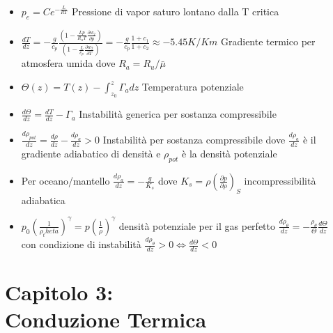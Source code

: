 \documentclass[a4paper]{article}
\begin{document}
\begin{itemize}
	\item $ p_e = C e^{- \frac{L}{RT}}$ Pressione di vapor saturo lontano dalla T critica
	\item $\frac{dT}{dz} = -\frac{g}{c_p} \frac{(1-\frac{Lp}{R_a T} \frac{\partial w_2}{\partial p})}{(1- \frac{L}{c_p} \frac{\partial w_2}{\partial T})} = -\frac{g}{c_p} \frac{1+c_1}{1+c_2} \approx -5.45K/Km$ Gradiente termico per atmosfera umida dove $R_a = R_u / \bar{\mu}$
	\item $\Theta (z)=T(z)-\int_{z_0}^{z}\Gamma_adz$ Temperatura potenziale
	\item $\frac{d \Theta}{dz}=\frac{dT}{dz}-\Gamma_a$ Instabilità generica per sostanza compressibile
	\item $\frac{d \rho_{pot}}{dz}=\frac{d \rho}{dz}-\frac{d \rho_a}{dz}>0 $ Instabilità per sostanza compressibile dove $\frac{d \rho_a}{dz}$ è il gradiente adiabatico di densità e $\rho_{pot}$ è la densità potenziale
	\item Per oceano/mantello $\frac{d \rho_a}{dz} = - \frac{g}{K_s}$ dove $K_s=\rho (\frac{\partial p}{\partial \rho})_S$ incompressibilità adiabatica
	\item $p_0(\frac{1}{\rho_theta})^\gamma=p(\frac{1}{\rho})^\gamma$ densità potenziale per il gas perfetto $\frac{d \rho_\theta}{dz}=-\frac{\rho_\theta}{\Theta} \frac{d \Theta}{dz}$ \\con condizione di instabilità $\frac{d \rho_\theta}{dz}>0 \iff \frac{d\Theta}{dz}<0$
	
\end{itemize}

\section{Capitolo 3:\\ Conduzione Termica}
\end{document}
